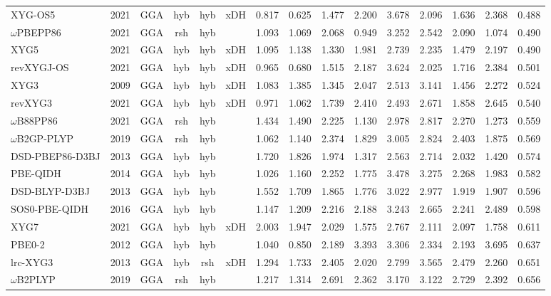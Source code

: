 \begin{landscape}
\begin{longtable}[c]{lc:cccc:rrrr:rr:rr:c}
XYG-OS5          & 2021 & GGA  & hyb & hyb & xDH & 0.817 & 0.625 & 1.477  & 2.200  & 3.678  & 2.096  & 1.636  & 2.368  & 0.488 \\
$\omega$PBEPP86         & 2021 & GGA  & rsh & hyb &     & 1.093 & 1.069 & 2.068  & 0.949  & 3.252  & 2.542  & 2.090  & 1.074  & 0.490 \\
XYG5             & 2021 & GGA  & hyb & hyb & xDH & 1.095 & 1.138 & 1.330  & 1.981  & 2.739  & 2.235  & 1.479  & 2.197  & 0.490 \\
revXYGJ-OS       & 2021 & GGA  & hyb & hyb & xDH & 0.965 & 0.680 & 1.515  & 2.187  & 3.624  & 2.025  & 1.716  & 2.384  & 0.501 \\
XYG3             & 2009 & GGA  & hyb & hyb & xDH & 1.083 & 1.385 & 1.345  & 2.047  & 2.513  & 3.141  & 1.456  & 2.272  & 0.524 \\
revXYG3          & 2021 & GGA  & hyb & hyb & xDH & 0.971 & 1.062 & 1.739  & 2.410  & 2.493  & 2.671  & 1.858  & 2.645  & 0.540 \\
$\omega$B88PP86         & 2021 & GGA  & rsh & hyb &     & 1.434 & 1.490 & 2.225  & 1.130  & 2.978  & 2.817  & 2.270  & 1.273  & 0.559 \\
$\omega$B2GP-PLYP       & 2019 & GGA  & rsh & hyb &     & 1.062 & 1.140 & 2.374  & 1.829  & 3.005  & 2.824  & 2.403  & 1.875  & 0.569 \\
DSD-PBEP86-D3BJ  & 2013 & GGA  & hyb & hyb &     & 1.720 & 1.826 & 1.974  & 1.317  & 2.563  & 2.714  & 2.032  & 1.420  & 0.574 \\
PBE-QIDH         & 2014 & GGA  & hyb & hyb &     & 1.026 & 1.160 & 2.252  & 1.775  & 3.478  & 3.275  & 2.268  & 1.983  & 0.582 \\
DSD-BLYP-D3BJ    & 2013 & GGA  & hyb & hyb &     & 1.552 & 1.709 & 1.865  & 1.776  & 3.022  & 2.977  & 1.919  & 1.907  & 0.596 \\
SOS0-PBE-QIDH    & 2016 & GGA  & hyb & hyb &     & 1.147 & 1.209 & 2.216  & 2.188  & 3.243  & 2.665  & 2.241  & 2.489  & 0.598 \\
XYG7             & 2021 & GGA  & hyb & hyb & xDH & 2.003 & 1.947 & 2.029  & 1.575  & 2.767  & 2.111  & 2.097  & 1.758  & 0.611 \\
PBE0-2           & 2012 & GGA  & hyb & hyb &     & 1.040 & 0.850 & 2.189  & 3.393  & 3.306  & 2.334  & 2.193  & 3.695  & 0.637 \\
lrc-XYG3         & 2013 & GGA  & hyb & rsh & xDH & 1.294 & 1.733 & 2.405  & 2.020  & 2.799  & 3.565  & 2.479  & 2.260  & 0.651 \\
$\omega$B2PLYP          & 2019 & GGA  & rsh & hyb &     & 1.217 & 1.314 & 2.691  & 2.362  & 3.170  & 3.122  & 2.729  & 2.392  & 0.656 \\

\end{longtable}
\end{landscape}
